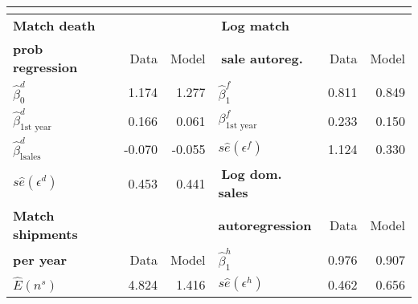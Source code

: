 \documentclass[notes=show]{beamer}
\begin{document}
\begin{frame}%


\begin{center}
{\small 
\begin{tabular}{lrrlrr}
\multicolumn{6}{c}{} \\ \hline\hline
\textbf{Match death }                    &        &        & $\ $\textbf{Log match }          &       &       \\
\textbf{prob regression}                 & Data   & Model  & $\ $\textbf{sale autoreg.}       & Data  & Model \\ \hline
$\widehat{\beta }_{0}^{d}$               & 1.174  & 1.277  & $\widehat{\beta }_{1}^{f}$       & 0.811 & 0.849 \\
$\widehat{\beta }_{\mbox{1st year}}^{d}$ & 0.166  & 0.061  & $\beta _{\mbox{1st year}}^{f}$ & 0.233 & 0.150 \\
$\widehat{\beta }_{\mbox{lsales}}^{d}$   & -0.070 & -0.055 & $s\widehat{e} (\epsilon ^{f})$   & 1.124 & 0.330 \\
$s\widehat{e}(\epsilon ^{d})$            & 0.453  & 0.441  & $\ $\textbf{Log dom. sales }     &       &       \\
\textbf{Match shipments }                &        &        & \textbf{autoregression}          & Data  & Model \\ \cline{4-6}
\textbf{per year}                        & Data   & Model  & $\widehat{\beta }_{1}^{h}$       & 0.976 & 0.907 \\ \cline{1-3}
$\widehat{E}\left( n^{s}\right) $        & 4.824  & 1.416  & $s\widehat{e}(\epsilon ^{h})$    & 0.462 & 0.656 \\ \hline
\end{tabular}%
}{\tiny \ }
\end{center}

\end{frame}%
\end{document}
